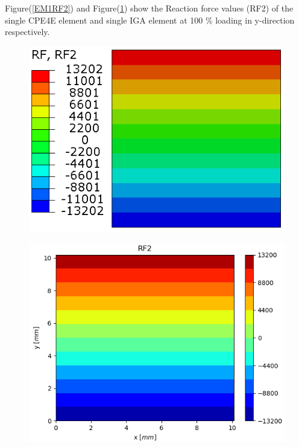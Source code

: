 \documentclass[11pt]{article}
\begin{document}
Figure(\ref{EM1RF2}) and Figure(\ref{EM1RF2_IGA}) show the Reaction force values (RF2) of the single CPE4E element and single IGA element at 100 \% loading in y-direction respectively. \\
\begin{figure}[H]
	\centering
	\begin{minipage}{.5\textwidth}
		\centering
		\includegraphics[width=1\linewidth]{EM1RF2.png}
		\label{EM1RF2}
	\end{minipage}%
	\begin{minipage}{.5\textwidth}
		\centering
		\includegraphics[width=1\linewidth]{EM1RF2_IGA.png}
		\label{EM1RF2_IGA}
	\end{minipage}
\end{figure}
\end{document}
